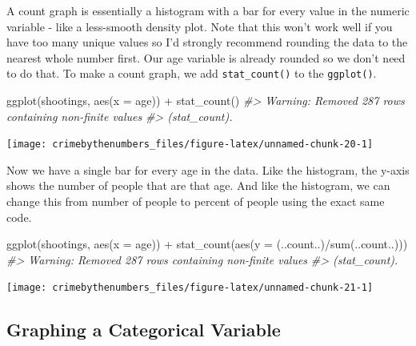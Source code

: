\documentclass[
  12pt,
  openany]{book}
\newenvironment{Shaded}{\begin{snugshade}}{\end{snugshade}}
\newcommand{\AttributeTok}[1]{\textcolor[rgb]{0.61,0.61,0.61}{#1}}
\newcommand{\CommentTok}[1]{\textcolor[rgb]{0.37,0.37,0.37}{\textit{#1}}}
\newcommand{\FunctionTok}[1]{\textcolor[rgb]{0,0,0}{#1}}
\newcommand{\NormalTok}[1]{#1}
\newcommand{\SpecialCharTok}[1]{\textcolor[rgb]{0,0,0}{#1}}
\begin{document}
A count graph is essentially a histogram with a bar for every value in the numeric variable - like a less-smooth density plot. Note that this won't work well if you have too many unique values so I'd strongly recommend rounding the data to the nearest whole number first. Our age variable is already rounded so we don't need to do that. To make a count graph, we add \texttt{stat\_count()} to the \texttt{ggplot()}.

\begin{Shaded}
\begin{Highlighting}[]
\FunctionTok{ggplot}\NormalTok{(shootings, }\FunctionTok{aes}\NormalTok{(}\AttributeTok{x =}\NormalTok{ age)) }\SpecialCharTok{+} 
  \FunctionTok{stat\_count}\NormalTok{()}
\CommentTok{\#\textgreater{} Warning: Removed 287 rows containing non{-}finite values}
\CommentTok{\#\textgreater{} (stat\_count).}
\end{Highlighting}
\end{Shaded}

\begin{center}\texttt{[image: crimebythenumbers\_files/figure-latex/unnamed-chunk-20-1]} \end{center}

Now we have a single bar for every age in the data. Like the histogram, the y-axis shows the number of people that are that age. And like the histogram, we can change this from number of people to percent of people using the exact same code.

\begin{Shaded}
\begin{Highlighting}[]
\FunctionTok{ggplot}\NormalTok{(shootings, }\FunctionTok{aes}\NormalTok{(}\AttributeTok{x =}\NormalTok{ age)) }\SpecialCharTok{+} 
  \FunctionTok{stat\_count}\NormalTok{(}\FunctionTok{aes}\NormalTok{(}\AttributeTok{y =}\NormalTok{ (..count..)}\SpecialCharTok{/}\FunctionTok{sum}\NormalTok{(..count..)))}
\CommentTok{\#\textgreater{} Warning: Removed 287 rows containing non{-}finite values}
\CommentTok{\#\textgreater{} (stat\_count).}
\end{Highlighting}
\end{Shaded}

\begin{center}\texttt{[image: crimebythenumbers\_files/figure-latex/unnamed-chunk-21-1]} \end{center}

\hypertarget{graphing-a-categorical-variable}{%
\subsection{Graphing a Categorical Variable}\label{graphing-a-categorical-variable}}
\end{document}
